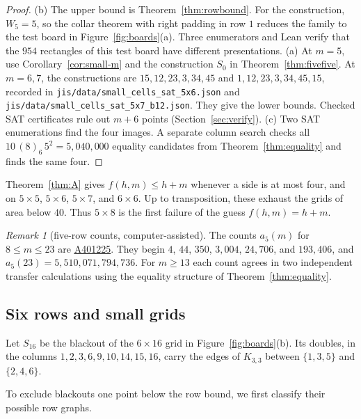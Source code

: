 \documentclass[12pt]{article}
\theoremstyle{plain}
\theoremstyle{definition}
\theoremstyle{remark}
\newtheorem{remark}[theorem]{Remark}
\newcommand{\seqnum}[1]{\href{https://oeis.org/#1}{\rm \underline{#1}}}
\begin{document}
\begin{proof}
(b) The upper bound is Theorem~\ref{thm:rowbound}.
For the construction, $W_5=5$, so the collar theorem with right padding
in row $1$ reduces the family to the test board in Figure~\ref{fig:boards}(a).
Three enumerators and Lean verify that the $954$ rectangles of this
test board have different presentations.
(a) At $m=5$, use Corollary~\ref{cor:small-m} and the construction $S_0$
in Theorem~\ref{thm:fivefive}. At $m=6,7$, the constructions are
$15,\allowbreak 12,\allowbreak 23,\allowbreak 3,\allowbreak 34,\allowbreak 45$ and
$1,\allowbreak 12,\allowbreak 23,\allowbreak 3,\allowbreak 34,\allowbreak 45,\allowbreak 15$,
recorded in \nolinkurl{jis/data/small_cells_sat_5x6.json} and
\nolinkurl{jis/data/small_cells_sat_5x7_b12.json}. They give the lower
bounds. Checked SAT certificates rule out $m+6$ points
(Section~\ref{sec:verify}).
(c) Two SAT enumerations find the four images. A separate column search
checks all $10\,(8)_6\,5^2=5{,}040{,}000$ equality candidates from
Theorem~\ref{thm:equality} and finds the same four.
\end{proof}

Theorem~\ref{thm:A} gives $f(h,m)\le h+m$ whenever a side is at most
four, and on $5\times5$, $5\times6$, $5\times7$, and $6\times6$.
Up to transposition, these exhaust the grids of area below $40$.
Thus $5\times8$ is the first failure of the guess $f(h,m)=h+m$.

\begin{remark}[five-row counts, computer-assisted]\label{rem:fivecounts}
The counts $a_5(m)$ for $8\le m\le23$ are \seqnum{A401225}. They begin $4$, $44$, $350$,
$3{,}004$, $24{,}706$, and $193{,}406$, and $a_5(23)=5{,}510{,}071{,}794{,}736$. For $m\ge13$
each count agrees in two independent transfer calculations using the equality structure of
Theorem~\ref{thm:equality}.
\end{remark}

\subsection{Six rows and small grids}

Let $S_{16}$ be the blackout of the $6\times16$ grid in Figure~\ref{fig:boards}(b). Its doubles,
in the columns $1,2,3,6,9,10,14,15,16$, carry the edges of $K_{3,3}$ between $\{1,3,5\}$ and
$\{2,4,6\}$.

To exclude blackouts one point below the row bound, we first classify
their possible row graphs.
\end{document}
